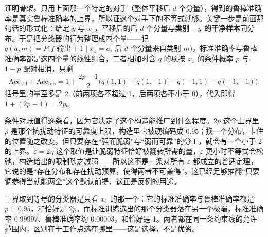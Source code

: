 证明骨架。只用上面那一个特定的对手（整体平移后 \(d\) 个分量），得到的鲁棒准确率是真实鲁棒准确率的上界，所以证这个对手下的不等式就够。关键一步是前面那句话的形式化：给定 \(y\) 与 \(x_1\)，平移后的后 \(d\) 个分量与\textbf{类别 \(-y\) 的干净样本}同分布。于是把分类器的行为整理成四个量——记 \(q(a,m)=P\big(f\text{ 输出}+1\;\big|\;x_1=a,\ \text{后 }d\text{ 个分量来自类别 }m\big)\)，标准准确率与鲁棒准确率都是这四个量的线性组合，二者相加时含 \(q\) 的项按 \(x_1\) 的条件概率 \(p\) 与 \(1-p\) 配对相消，只剩
\[
\mathrm{Acc}_{\mathrm{std}}+\mathrm{Acc}_{\mathrm{rob}}
=1+\frac{2p-1}{2}\Big(q(1,1)+q(1,-1)-q(-1,1)-q(-1,-1)\Big).
\]
括号里的量至多是 \(2\)（前两项各不超过 1，后两项各不小于 0），代入即得 \(1+(2p-1)=2p\)。

条件对账值得逐条看，因为它决定了这个构造能推广到什么程度。\(2p\) 这个上界里 \(p\) 是那个抗扰动特征的可靠度上限，构造里它被硬编码成 \(0.95\)；换一个分布，卡住的位置随之改变，但只要存在``强而脆弱''与``弱而可靠''的分工，就会有一个小于 2 的上界。\(\varepsilon=2\eta\) 这个取值是让脆弱特征恰好被翻转所需的量，\(\varepsilon\) 更小时不等式会松弛，构造给出的限制随之减弱——所以这不是一条对所有 \(\varepsilon\) 都成立的普适定理，它说的是``存在分布和存在扰动预算，使得两者不可兼得''。这已经足够推翻``只要调参得当就能两全''这个默认前提，这正是反例的用途。

\begin{remark}
上界取到等号的分类器是只看 \(x_1\) 的那一个：它的标准准确率与鲁棒准确率都是 \(p=0.95\)，和恰好是 \(2p\)。而标准训练选出的那个分类器落在另一个极端，标准准确率 \(0.99997\)、鲁棒准确率约 \(0.00003\)，和恰好是 1。两者都在同一条约束线的允许范围内，区别在于工作点选在哪里——这是选择，不是优劣。
\end{remark}

